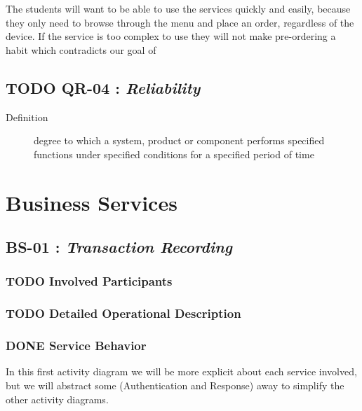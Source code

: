 \documentclass[11pt]{article}
\begin{document}
The students will want to be able to use the services quickly and
easily, because they only need to browse through the menu and place
an order, regardless of the device. If the service is too complex
to use they will not make pre-ordering a habit which contradicts
our goal of 
\newpage
\subsection{{\bfseries\sffamily TODO} \label{org1d355e4}QR-04 : \emph{Reliability}}
\label{sec:org1047026}
\begin{description}
\item[{Definition}] degree to which a system, product or component
performs specified functions under specified
conditions for a specified period of time
\end{description}
\section{Business Services}
\label{sec:org0b2e78a}
\subsection{\label{org50503ff}BS-01 : \emph{Transaction Recording}}
\label{sec:orgc1087e0}
\subsubsection{{\bfseries\sffamily TODO} Involved Participants}
\label{sec:org4599f26}
\subsubsection{{\bfseries\sffamily TODO} Detailed Operational Description}
\label{sec:org84c0274}
\subsubsection{{\bfseries\sffamily DONE} Service Behavior}
\label{sec:orgb8e627c}
In this first activity diagram we will be more explicit about each
service involved, but we will abstract some (Authentication and
Response) away to simplify the other activity diagrams.
\end{document}
